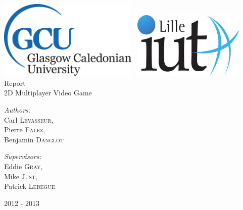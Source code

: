 \begin{titlepage}
\begin{center}

\includegraphics[width=0.5\textwidth]{gcu.jpg}~
\includegraphics[width=0.4\textwidth]{lille1.jpg}~\\[3cm]

\LARGE Report
\HRule\\[0.5cm]
\LARGE 2D Multiplayer Video Game
\HRule\\[1.5cm]

\begin{minipage}{0.4\textwidth}
\begin{flushleft} \large
\emph{Authors:}\\
Carl \textsc{Levasseur},\\
Pierre \textsc{Falez},\\
Benjamin \textsc{Danglot}

\end{flushleft}
\end{minipage}
\begin{minipage}{0.4\textwidth}
\begin{flushright} \large
\emph{Supervisors:} \\
Eddie \textsc{Gray},\\
Mike \textsc{Just},\\
Patrick \textsc{Lebegue}
\end{flushright}
\end{minipage}


\vfill

{\large 2012 - 2013}

\end{center}
\end{titlepage}
